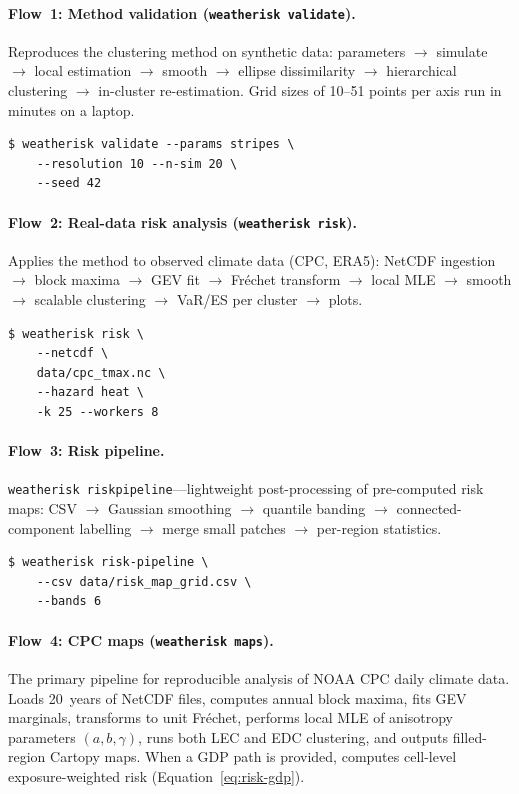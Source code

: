 \documentclass[a4paper]{elsarticle}
\begin{document}
\paragraph{Flow~1: Method validation (\texttt{weatherisk validate}).}
Reproduces the clustering method on synthetic data:
parameters $\to$ simulate $\to$ local estimation $\to$ smooth $\to$
ellipse dissimilarity $\to$ hierarchical clustering $\to$ in-cluster
re-estimation.
Grid sizes of 10--51 points per axis run in minutes on a laptop.

\begin{lstlisting}[caption={Running the validation flow.},label=lst:validate]
$ weatherisk validate --params stripes \
    --resolution 10 --n-sim 20 \
    --seed 42
\end{lstlisting}

\paragraph{Flow~2: Real-data risk analysis (\texttt{weatherisk risk}).}
Applies the method to observed climate data (CPC, ERA5):
NetCDF ingestion $\to$ block maxima $\to$ GEV fit $\to$ Fr\'{e}chet
transform $\to$ local MLE $\to$ smooth $\to$ scalable clustering
$\to$ VaR/ES per cluster $\to$ plots.

\begin{lstlisting}[caption={Running the risk analysis flow.},label=lst:risk]
$ weatherisk risk \
    --netcdf \
    data/cpc_tmax.nc \
    --hazard heat \
    -k 25 --workers 8
\end{lstlisting}

\paragraph{Flow~3: Risk pipeline.}
\begin{sloppypar}
\texttt{weatherisk risk\-pipe\-line}---lightweight
post-processing of pre-computed risk maps:
CSV $\to$ Gaussian smoothing $\to$ quantile banding $\to$
connected-component labelling $\to$ merge small patches
$\to$ per-region statistics.
\end{sloppypar}

\begin{lstlisting}[caption={Running the risk pipeline.},label=lst:riskpipe]
$ weatherisk risk-pipeline \
    --csv data/risk_map_grid.csv \
    --bands 6
\end{lstlisting}

\paragraph{Flow~4: CPC maps (\texttt{weatherisk maps}).}
The primary pipeline for reproducible analysis of NOAA CPC daily climate
data.  Loads 20~years of NetCDF files, computes annual block maxima,
fits GEV marginals, transforms to unit Fr\'{e}chet, performs local MLE of
anisotropy parameters $(a, b, \gamma)$, runs both LEC and EDC clustering,
and outputs filled-region Cartopy maps.
When a GDP path is provided, computes cell-level exposure-weighted risk
(Equation~\ref{eq:risk-gdp}).
\end{document}

